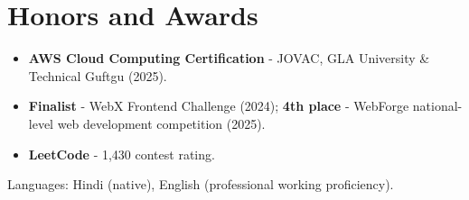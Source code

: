 \documentclass[11pt,a4paper,sans]{moderncv}
\begin{document}

\section{Honors and Awards}
\vspace{1pt}
\begin{itemize}
    \item {\textbf{AWS Cloud Computing Certification} - JOVAC, GLA University \& Technical Guftgu (2025).}
    \item {\textbf{Finalist} - WebX Frontend Challenge (2024); \textbf{4th place} - WebForge national-level web development competition (2025).}
    \item {\textbf{LeetCode} - 1,430 contest rating.}
\end{itemize}


\vspace{2pt}
\small{Languages: Hindi (native), English (professional working proficiency).}
\end{document}
